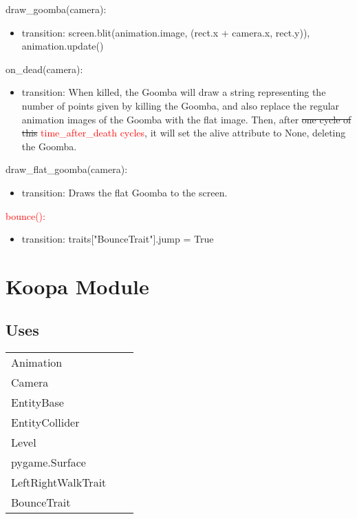 \documentclass[12pt]{article}
\begin{document}
draw\_goomba(camera):
\begin{itemize}
    \item transition: screen.blit(animation.image, (rect.x + camera.x, rect.y)), animation.update()
\end{itemize}

on\_dead(camera):
\begin{itemize}
    \item transition: When killed, the Goomba will draw a string representing the number of points given by killing the Goomba, and also replace the regular animation images of the Goomba with the flat image. Then, after \st{one cycle of this} \textcolor{red}{time\_after\_death cycles}, it will set the alive attribute to None, deleting the Goomba.
\end{itemize}

draw\_flat\_goomba(camera):
\begin{itemize}
    \item transition: Draws the flat Goomba to the screen.
\end{itemize}

\textcolor{red}{bounce():}
\begin{itemize}
    \item \color{red}transition: traits["BounceTrait"].jump = True
\end{itemize}

\newpage

\section*{Koopa Module}

\subsection* {Uses}

\begin{tabular}{lll}
    Animation & & \\
    Camera & & \\
    EntityBase & & \\
    \color{red}EntityCollider & & \\
    Level & & \\
    pygame.Surface & & \\
    \color{red}LeftRightWalkTrait & & \\
    \color{red}BounceTrait & & \\
\end{tabular}
\end{document}
